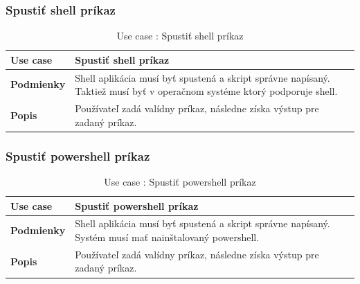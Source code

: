 \subsubsection{Spustiť shell príkaz}
\begin{center}
	\begin{table}[htbp]
		\begin{tabular}{|p{2.5cm}|p{14cm}|}
			\hline
			\textbf{Use case} & Spustiť shell príkaz \\ 
			\hline
			\textbf{Podmienky} & Shell aplikácia musí byť spustená a skript správne napísaný. Taktiež musí byť v operačnom systéme ktorý podporuje shell. \\ 
			\hline
			\textbf{Popis} & Používateľ zadá valídny príkaz, následne získa výstup pre zadaný príkaz. \\ 
			\hline
		\end{tabular}
	\label{table:1}
	\caption{Use case : Spustiť shell príkaz}
	\end{table}
\end{center}
\subsubsection{Spustiť powershell príkaz}
\begin{center}
	\begin{table}[htbp]
		\begin{tabular}{|p{2.5cm}|p{14cm}|}
			\hline
			\textbf{Use case} & Spustiť powershell príkaz \\ 
			\hline
			\textbf{Podmienky} & Shell aplikácia musí byť spustená a skript správne napísaný. Systém musí mať nainštalovaný powershell.\\ 
			\hline
			\textbf{Popis} & Používateľ zadá valídny príkaz, následne získa výstup pre zadaný príkaz. \\ 
			\hline
		\end{tabular}
	\label{table:1}
	\caption{Use case : Spustiť powershell príkaz}
	\end{table}
\end{center}
